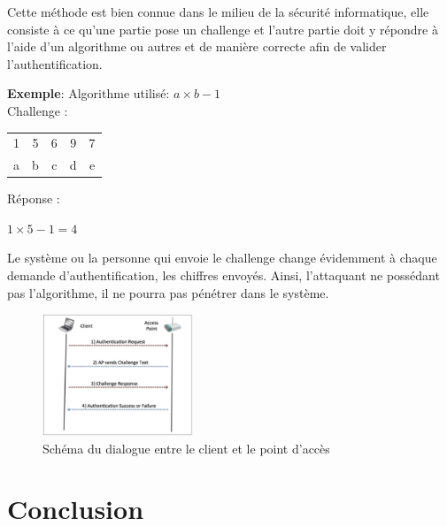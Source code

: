\documentclass[a4paper]{article}
\begin{document}
Cette méthode est bien connue dans le milieu de la sécurité informatique, elle consiste à ce qu’une partie pose un challenge et l’autre partie doit y répondre à l’aide d’un algorithme ou autres et de manière correcte afin de valider l’authentification.


\textbf{Exemple}: Algorithme utilisé: $ a \times b - 1 $ \\
Challenge :
\begin{center} \begin{tabular}{c|c|c|c|c}
    1 & 5 & 6 & 9 & 7 \\
    a & b & c & d & e
\end{tabular} \end{center}
Réponse : \begin{center} $ 1 \times 5 - 1 = 4 $ \end{center}

Le système ou la personne qui envoie le challenge change évidemment à chaque demande d’authentification, les chiffres envoyés. Ainsi, l’attaquant ne possédant pas l’algorithme, il ne pourra pas pénétrer dans le système.

\begin{figure}[H]
    \centering
    \includegraphics[width=0.4\textwidth]{images/Capture001.PNG}
    \caption{Schéma du dialogue entre le client et le point d'accès}
    \label{}
\end{figure}













\section{Conclusion}
\end{document}
